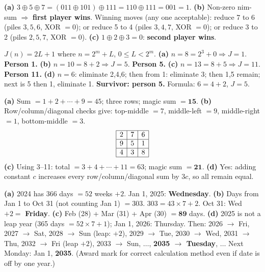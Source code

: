 \begin{solution}
\textbf{(a)} $3 \oplus 5 \oplus 7 = (011 \oplus 101) \oplus 111 = 110 \oplus 111 = 001 = 1$.
\textbf{(b)} Non-zero nim-sum $\Rightarrow$ \textbf{first player wins}. Winning moves (any one acceptable): reduce 7 to 6 (piles $3,5,6$, XOR $= 0$); or reduce 5 to 4 (piles $3,4,7$, XOR $= 0$); or reduce 3 to 2 (piles $2,5,7$, XOR $= 0$).
\textbf{(c)} $1 \oplus 2 \oplus 3 = 0$: \textbf{second player wins}.
\end{solution}

\begin{solution}
$J(n)=2L+1$ where $n = 2^m + L$, $0 \le L < 2^m$.
\textbf{(a)} $n=8=2^3+0 \Rightarrow J = 1$. \textbf{Person 1.}
\textbf{(b)} $n=10=8+2 \Rightarrow J = 5$. \textbf{Person 5.}
\textbf{(c)} $n=13=8+5 \Rightarrow J = 11$. \textbf{Person 11.}
\textbf{(d)} $n=6$: eliminate 2,4,6; then from 1: eliminate 3; then 1,5 remain; next is 5 then 1, eliminate 1. \textbf{Survivor: person 5.} Formula: $6=4+2$, $J=5$.\ \checkmark
\end{solution}

\begin{solution}
\textbf{(a)} Sum $= 1+2+\cdots+9=45$; three rows; magic sum $= \mathbf{15}$.
\textbf{(b)} Row/column/diagonal checks give: top-middle $=7$, middle-left $=9$,
middle-right $=1$, bottom-middle $=3$.
\[
\begin{array}{|c|c|c|}\hline 2&7&6\\\hline 9&5&1\\\hline 4&3&8\\\hline\end{array}
\]
\textbf{(c)} Using 3--11: total $=3+4+\cdots+11=63$; magic sum $= \mathbf{21}$.
\textbf{(d)} Yes: adding constant $c$ increases every row/column/diagonal sum by $3c$, so all remain equal.
\end{solution}

\begin{solution}[14. Calendar]
\textbf{(a)} 2024 has 366 days $= 52$ weeks $+ 2$. Jan 1, 2025: \textbf{Wednesday}.
\textbf{(b)} Days from Jan 1 to Oct 31 (not counting Jan 1) $= 303$. $303 = 43\times7+2$. Oct 31: Wed $+2 =$ \textbf{Friday}.
\textbf{(c)} Feb (28) + Mar (31) + Apr (30) $= \mathbf{89}$ days.
\textbf{(d)} 2025 is not a leap year (365 days $= 52\times7+1$); Jan 1, 2026: Thursday. Then: 2026 $\to$ Fri, 2027 $\to$ Sat, 2028 $\to$ Sun (leap: $+2$), 2029 $\to$ Tue, 2030 $\to$ Wed, 2031 $\to$ Thu, 2032 $\to$ Fri (leap $+2$), 2033 $\to$ Sun, $\ldots$, \textbf{2035 $\to$ Tuesday}, $\ldots$ Next Monday: Jan 1, \textbf{2035}. (Award mark for correct calculation method even if date is off by one year.)
\end{solution}


